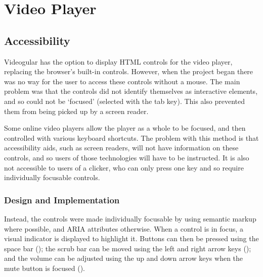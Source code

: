 \chapter{Video Player} 
\label{Chapter:Video Player}

\chapterpreamble{}

\section{Accessibility} 
\label{Section:Accessibility}
\gls{Videogular} has the option to display HTML controls for the video player, replacing the browser's built-in controls. However, when the project began there was no way for the user to access these controls without a mouse. The main problem was that the controls did not identify themselves as interactive elements, and so could not be `focused' (selected with the tab key). This also prevented them from being picked up by a screen reader.

Some online video players allow the player as a whole to be focused, and then controlled with various keyboard shortcuts. The problem with this method is that accessibility aids, such as screen readers, will not have information on these controls, and so users of those technologies will have to be instructed. It is also not accessible to users of a clicker, who can only press one key and so require individually focusable controls.

\subsection{Design and Implementation} 
Instead, the controls were made individually focusable by using semantic markup where possible, and \gls{ARIA} attributes otherwise. When a control is in focus, a visual indicator is displayed to highlight it. Buttons can then be pressed using the space bar (); the scrub bar can be moved using the left and right arrow keys (); and the volume can be adjusted using the up and down arrow keys when the mute button is focused ().

